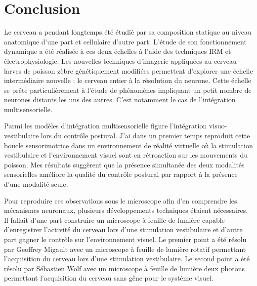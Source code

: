 \chapter{Conclusion}\label{chapV}





Le cerveau a pendant longtemps été étudié par sa composition statique au niveau anatomique d'une part et cellulaire d'autre part. L'étude de son fonctionnement dynamique a été réalisée à ces deux échelles à l'aide des techniques IRM et électrophysiologie. Les nouvelles techniques d'imagerie appliquées au cerveau larves de poisson zèbre génétiquement modifiées permettent d'explorer une échelle intermédiaire nouvelle : le cerveau entier à la résolution du neurone. Cette échelle se prête particulièrement à l'étude de phénomènes impliquant un petit nombre de neurones distants les uns des autres. C'est notamment le cas de l'intégration multisensorielle.

Parmi les modèles d'intégration multisensorielle figure l'intégration visuo-vesti\-bulaire lors du contrôle postural. J'ai dans un premier temps reproduit cette boucle sensorimotrice dans un environnement de réalité virtuelle où la stimulation vestibulaire et l'environnement visuel sont en rétroaction sur les mouvements du poisson. Mes résultats suggèrent que la présence simultanée des deux modalités sensorielles améliore la qualité du contrôle postural par rapport à la présence d'une modalité seule.

Pour reproduire ces observations sous le microscope afin d'en comprendre les mécanismes neuronaux, plusieurs développements techniques étaient nécessaires. Il fallait d'une part construire un microscope à feuille de lumière capable d'enregistrer l'activité du cerveau lors d'une stimulation vestibulaire et d'autre part gagner le contrôle sur l'environnement visuel. Le premier point a été résolu par Geoffrey Migault avec un microscope à feuille de lumière rotatif permettant l'acquisition du cerveau lors d'une stimulation vestibulaire. Le second point a été résolu par Sébastien Wolf avec un microscope à feuille de lumière deux photons permettant l'acquisition du cerveau sans gêne pour le système visuel.

